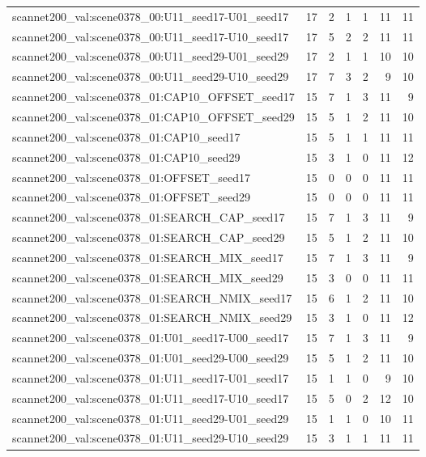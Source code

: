 \begin{table}[t]
\begin{tabular}{lrrrrrr}
scannet200\_val:scene0378\_00:U11\_seed17-U01\_seed17 & 17 & 2 & 1 & 1 & 11 & 11 \\
scannet200\_val:scene0378\_00:U11\_seed17-U10\_seed17 & 17 & 5 & 2 & 2 & 11 & 11 \\
scannet200\_val:scene0378\_00:U11\_seed29-U01\_seed29 & 17 & 2 & 1 & 1 & 10 & 10 \\
scannet200\_val:scene0378\_00:U11\_seed29-U10\_seed29 & 17 & 7 & 3 & 2 & 9 & 10 \\
scannet200\_val:scene0378\_01:CAP10\_OFFSET\_seed17 & 15 & 7 & 1 & 3 & 11 & 9 \\
scannet200\_val:scene0378\_01:CAP10\_OFFSET\_seed29 & 15 & 5 & 1 & 2 & 11 & 10 \\
scannet200\_val:scene0378\_01:CAP10\_seed17 & 15 & 5 & 1 & 1 & 11 & 11 \\
scannet200\_val:scene0378\_01:CAP10\_seed29 & 15 & 3 & 1 & 0 & 11 & 12 \\
scannet200\_val:scene0378\_01:OFFSET\_seed17 & 15 & 0 & 0 & 0 & 11 & 11 \\
scannet200\_val:scene0378\_01:OFFSET\_seed29 & 15 & 0 & 0 & 0 & 11 & 11 \\
scannet200\_val:scene0378\_01:SEARCH\_CAP\_seed17 & 15 & 7 & 1 & 3 & 11 & 9 \\
scannet200\_val:scene0378\_01:SEARCH\_CAP\_seed29 & 15 & 5 & 1 & 2 & 11 & 10 \\
scannet200\_val:scene0378\_01:SEARCH\_MIX\_seed17 & 15 & 7 & 1 & 3 & 11 & 9 \\
scannet200\_val:scene0378\_01:SEARCH\_MIX\_seed29 & 15 & 3 & 0 & 0 & 11 & 11 \\
scannet200\_val:scene0378\_01:SEARCH\_NMIX\_seed17 & 15 & 6 & 1 & 2 & 11 & 10 \\
scannet200\_val:scene0378\_01:SEARCH\_NMIX\_seed29 & 15 & 3 & 1 & 0 & 11 & 12 \\
scannet200\_val:scene0378\_01:U01\_seed17-U00\_seed17 & 15 & 7 & 1 & 3 & 11 & 9 \\
scannet200\_val:scene0378\_01:U01\_seed29-U00\_seed29 & 15 & 5 & 1 & 2 & 11 & 10 \\
scannet200\_val:scene0378\_01:U11\_seed17-U01\_seed17 & 15 & 1 & 1 & 0 & 9 & 10 \\
scannet200\_val:scene0378\_01:U11\_seed17-U10\_seed17 & 15 & 5 & 0 & 2 & 12 & 10 \\
scannet200\_val:scene0378\_01:U11\_seed29-U01\_seed29 & 15 & 1 & 1 & 0 & 10 & 11 \\
scannet200\_val:scene0378\_01:U11\_seed29-U10\_seed29 & 15 & 3 & 1 & 1 & 11 & 11 \\

\end{tabular}
\end{table}
